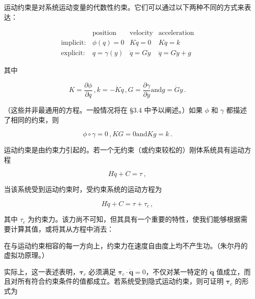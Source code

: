 \documentclass[10pt,a4paper]{book}
\theoremstyle{thmstyle} %
\theoremstyle{defstyle} %
\theoremstyle{prostyle} %
\begin{document}
运动约束是对系统运动变量的代数性约束。它们可以通过以下两种不同的方式来表达：



$$
{ \begin{array}{rlrl} & { { \mathrm { p o s i t i o n } } } & { { \mathrm { v e l o c i t y } } } & { { \mathrm { a c c e l e r a t i o n } } } \\{ { \mathrm { i m p l i c i t : } } } & { { \phi ( q ) = 0 } } & { { K { \dot { q } } = 0 } } & { { K { \ddot { q } } = k } } \\{ { \mathrm { e x p l i c i t : } } } & { { q = \gamma ( y ) } } & { { { \dot { q } } = G { \dot { y } } } } & { { \ddot { q } = G { \ddot { y } } + g } } \end{array} }
$$



其中



$$
K = \frac { \partial \phi } { \partial q } \, ,  k = - \dot { K } \dot { q } \, ,  G = \frac { \partial \gamma } { \partial y }  \mathrm { a n d }  g = \dot { G } y \, .
$$



（这些并非最通用的方程。一般情况将在 §3.4 中予以阐述。）如果 $\phi$ 和 $\gamma$ 都描述了相同的约束，则



$$
\phi \circ \gamma = 0 \, ,  K G = 0  \mathrm { a n d }  K g = k \, .
$$



运动约束是由约束力引起的。若一个无约束（或约束较松的）刚体系统具有运动方程



$$
H \ddot { q } + C = \tau \ ,
$$



当该系统受到运动约束时，受约束系统的运动方程为



$$
H \ddot { q } + C = \tau + \tau _ { c } \, ,
$$



其中 $\tau_{c}$ 为约束力。该力尚不可知，但其具有一个重要的特性，使我们能够根据需要计算其值，或将其从方程中消去：



在与运动约束相容的每一方向上，约束力在速度自由度上均不产生功。（朱尔丹的虚拟功原理。）



实际上，这一表述表明，$\boldsymbol{\tau}_{c}$ 必须满足 $\boldsymbol{\tau}_{c} \cdot \dot{\boldsymbol{q}}=0$，不仅对某一特定的 $\dot{\boldsymbol{q}}$ 值成立，而且对所有符合约束条件的值都成立。若系统受到隐式运动约束，则可证明 $\boldsymbol{\tau}_{c}$ 的形式为
\end{document}
